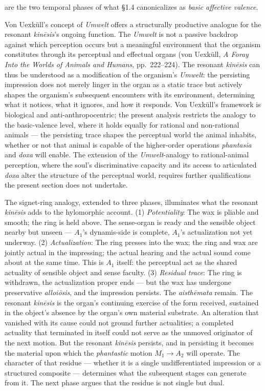 are the two temporal phases of what \S 1.4 canonicalizes as \textit{basic affective valence}.

Von Uexküll's concept of \textit{Umwelt} offers a structurally productive analogue for the resonant \textit{kinēsis}'s ongoing function. The \textit{Umwelt} is not a passive backdrop against which perception occurs but a meaningful environment that the organism constitutes through its perceptual and effectual organs (von Uexküll, \textit{A Foray Into the Worlds of Animals and Humans}, pp.~222--224). The resonant \textit{kinēsis} can thus be understood as a modification of the organism's \textit{Umwelt}: the persisting impression does not merely linger in the organ as a static trace but actively shapes the organism's subsequent encounters with its environment, determining what it notices, what it ignores, and how it responds. Von Uexküll's framework is biological and anti-anthropocentric; the present analysis restricts the analogy to the basic-valence level, where it holds equally for rational and non-rational animals --- the persisting trace shapes the perceptual world the animal inhabits, whether or not that animal is capable of the higher-order operations \textit{phantasia} and \textit{doxa} will enable. The extension of the \textit{Umwelt}-analogy to rational-animal perception, where the soul's discriminative capacity and its access to articulated \textit{doxa} alter the structure of the perceptual world, requires further qualifications the present section does not undertake.

The signet-ring analogy, extended to three phases, illuminates what the resonant \textit{kinēsis} adds to the hylomorphic account. (1) \textit{Potentiality}: The wax is pliable and smooth; the ring is held above. The sense-organ is ready and the sensible object nearby but unseen --- $A_1$'s dynamis-side is complete, $A_1$'s actualization not yet underway. (2) \textit{Actualization}: The ring presses into the wax; the ring and wax are jointly actual in the impressing; the actual hearing and the actual sound come about at the same time. This is $A_1$ itself: the perceptual act as the shared actuality of sensible object and sense faculty. (3) \textit{Residual trace}: The ring is withdrawn, the actualization proper ends --- but the wax has undergone preservative \textit{alloiōsis}, and the impression persists. The \textit{aisthēmata} remain. The resonant \textit{kinēsis} is the organ's continuing exercise of the form received, sustained in the object's absence by the organ's own material substrate. An alteration that vanished with its cause could not ground further actualities; a completed actuality that terminated in itself could not serve as the unmoved originator of the next motion. But the resonant \textit{kinēsis} persists, and in persisting it becomes the material upon which the \textit{phantastic} motion $M_1 \rightarrow A_2$ will operate. The character of that residue --- whether it is a single undifferentiated impression or a structured composite --- determines what the subsequent stages can generate from it. The next phase argues that the residue is not single but dual.

